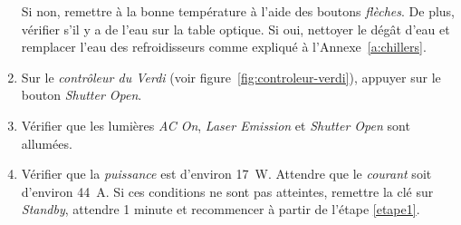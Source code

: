 \begin{enumerate}
\begin{figure}[H]
        \label{fig:cooler}
        \end{figure}
    Si non, remettre à la bonne température à l'aide des boutons \textit{flèches}. De plus, vérifier s'il y a de l'eau sur la table optique. Si oui, nettoyer le dégât d'eau et remplacer l'eau des refroidisseurs comme expliqué à l'Annexe~\ref{a:chillers}.
    \item Sur le \textit{contrôleur du Verdi} (voir figure~\ref{fig:controleur-verdi}), appuyer sur le bouton \textit{Shutter Open}.
    \item Vérifier que les lumières \textit{AC On}, \textit{Laser Emission} et \textit{Shutter Open} sont allumées.
    \item Vérifier que la \textit{puissance} est d'environ 17~W. Attendre que le \textit{courant} soit d'environ 44~A. Si ces conditions ne sont pas atteintes, remettre la clé sur \textit{Standby}, attendre 1 minute et recommencer à partir de l'étape \ref{etape1}.
\end{enumerate}
